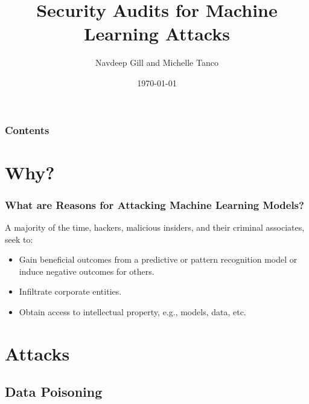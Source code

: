 \documentclass[11pt,
               aspectratio=169,
               hyperref={colorlinks}
               ]{beamer}
\author{\hspace{1pt}Navdeep Gill and Michelle Tanco}
\title{Security Audits for Machine Learning Attacks}
\institute{\href{https://www.h2o.ai}{H\textsubscript{2}O.ai}}
\date{\today}
\begin{document}
	
	\maketitle
	
	\begin{frame}
	
		\frametitle{Contents}
		
		\tableofcontents{}
		
	\end{frame}

	\section{Why?}

	\begin{frame}
		
		\frametitle{What are Reasons for Attacking Machine Learning Models?}
A majority of the time, hackers, malicious insiders, and their criminal associates, seek to:
			\begin{itemize}
				\item Gain beneficial outcomes from a predictive or pattern recognition model or induce negative outcomes for others. %
				\item Infiltrate corporate entities.
				\item Obtain access to intellectual property, e.g., models, data, etc.
			\end{itemize}	
		\end{frame}

	\section{Attacks}

		\subsection{Data Poisoning}
\end{document}
